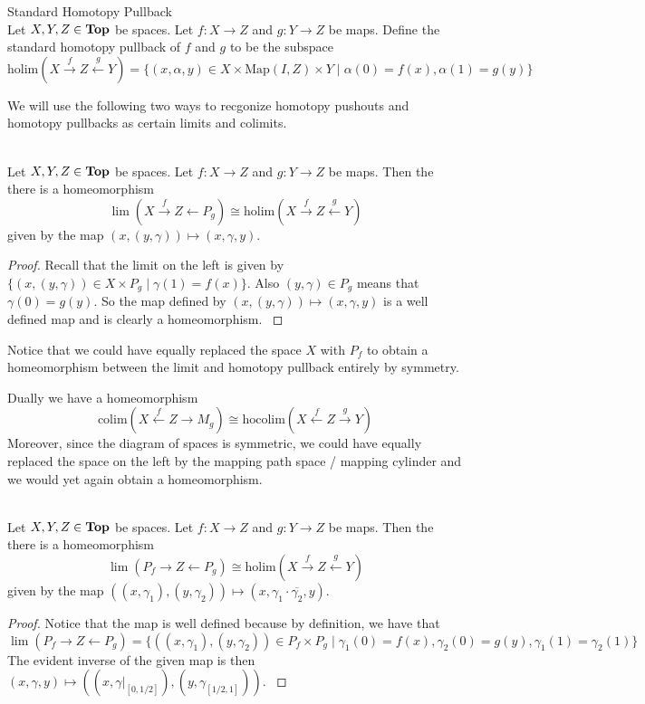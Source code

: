 \documentclass[a4paper]{article}
\begin{document}
\begin{defn}{Standard Homotopy Pullback}{}\\
Let $X,Y,Z\in\bold{Top}$ be spaces. Let $f:X\to Z$ and $g:Y\to Z$ be maps. Define the standard homotopy pullback of $f$ and $g$ to be the subspace $$\text{holim}(X\overset{f}{\rightarrow}Z\overset{g}{\leftarrow}Y)=\{(x,\alpha,y)\in X\times\text{Map}(I,Z)\times Y\;|\;\alpha(0)=f(x),\alpha(1)=g(y)\}$$
\end{defn}

We will use the following two ways to recgonize homotopy pushouts and homotopy pullbacks as certain limits and colimits. 

\begin{prp}{}{}\\
Let $X,Y,Z\in\bold{Top}$ be spaces. Let $f:X\to Z$ and $g:Y\to Z$ be maps. Then the there is a homeomorphism $$\lim(X\overset{f}{\rightarrow}Z\leftarrow P_g)\cong\text{holim}(X\overset{f}{\rightarrow}Z\overset{g}{\leftarrow}Y)$$ given by the map $(x,(y,\gamma))\mapsto(x,\gamma,y)$. 
\begin{proof}
Recall that the limit on the left is given by $\{(x,(y,\gamma))\in X\times P_g\;|\;\gamma(1)=f(x)\}$. Also $(y,\gamma)\in P_g$ means that $\gamma(0)=g(y)$. So the map defined by $(x,(y,\gamma))\mapsto(x,\gamma,y)$ is a well defined map and is clearly a homeomorphism. \cite{CHT}
\end{proof}
\end{prp}

Notice that we could have equally replaced the space $X$ with $P_f$ to obtain a homeomorphism between the limit and homotopy pullback entirely by symmetry.  

Dually we have a homeomorphism $$\text{colim}(X\overset{f}{\leftarrow}Z\rightarrow M_g)\cong\text{hocolim}(X\overset{f}{\leftarrow}Z\overset{g}{\rightarrow}Y)$$ Moreover, since the diagram of spaces is symmetric, we could have equally replaced the space on the left by the mapping path space / mapping cylinder and we would yet again obtain a homeomorphism. 

\begin{prp}{}{}\\
Let $X,Y,Z\in\bold{Top}$ be spaces. Let $f:X\to Z$ and $g:Y\to Z$ be maps. Then the there is a homeomorphism $$\lim(P_f\rightarrow Z\leftarrow P_g)\cong\text{holim}(X\overset{f}{\rightarrow}Z\overset{g}{\leftarrow}Y)$$ given by the map $((x,\gamma_1),(y,\gamma_2))\mapsto(x,\gamma_1\cdot\overline{\gamma_2},y)$. 
\begin{proof}
Notice that the map is well defined because by definition, we have that $$\lim(P_f\rightarrow Z\leftarrow P_g)=\{((x,\gamma_1),(y,\gamma_2))\in P_f\times P_g\;|\;\gamma_1(0)=f(x),\gamma_2(0)=g(y),\gamma_1(1)=\gamma_2(1)\}$$ The evident inverse of the given map is then $(x,\gamma,y)\mapsto((x,\gamma|_{[0,1/2]}),(y,\gamma_{[1/2,1]}))$. \cite{CHT}
\end{proof}
\end{prp}
\end{document}
